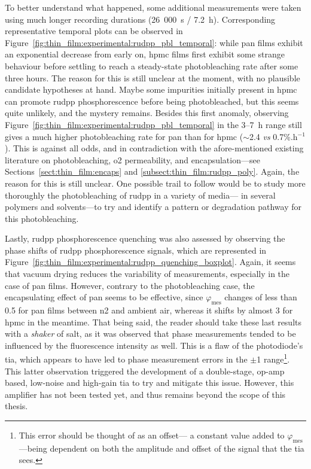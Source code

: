To better understand what happened, some additional measurements were taken using much longer recording durations (26~000~s / 7.2~h). Corresponding representative temporal plots can be observed in Figure~\ref{fig:thin_film:experimental:rudpp_pbl_temporal}: while \gls{pan} films exhibit an exponential decrease from early on, \gls{hpmc} films first exhibit some strange behaviour before settling to reach a steady-state photobleaching rate after some three hours. The reason for this is still unclear at the moment, with no plausible candidate hypotheses at hand. Maybe some impurities initially present in \gls{hpmc} can promote \gls{rudpp} phosphorescence before being photobleached, but this seems quite unlikely, and the mystery remains. Besides this first anomaly, observing Figure~\ref{fig:thin_film:experimental:rudpp_pbl_temporal} in the 3--7~h range still gives a much higher photobleaching rate for \gls{pan} than for \gls{hpmc} ($\sim$2.4 \textit{vs} 0.7\%.h$^{-1}$). This is against all odds, and in contradiction with the afore-mentioned existing literature on photobleaching, \gls{o2} permeability, and encapsulation---see Sections~\ref{sect:thin_film:encaps} and \ref{subsect:thin_film:rudpp_poly}. Again, the reason for this is still unclear. One \mfrin{}possible trail to follow would be to study more thoroughly the photobleaching of \gls{rudpp} in a variety of media---\ie{} in several polymers and solvents---to try and identify a pattern or degradation pathway for this photobleaching.

Lastly, \gls{rudpp} phosphorescence quenching was also assessed by observing the phase shifts of \gls{rudpp} phosphorescence signals, which are represented in Figure~\ref{fig:thin_film:experimental:rudpp_quenching_boxplot}. Again, it seems that vacuum drying reduces the variability of measurements, especially in the case of \gls{pan} films. However, contrary to the photobleaching case, the encapsulating effect of \gls{pan} seems to be effective, since $\varphi_\text{mes}$ changes of less than 0.5{\degree} for \gls{pan} films between \gls{n2} and ambient air, whereas it shifts by almost 3{\degree} for \gls{hpmc} in the meantime. That being said, the reader should take these last results with a \emph{shaker} of salt, as it was observed that phase measurements tended to be influenced by the fluorescence intensity as well. This is a flaw of the photodiode's \gls{tia}, which appears to have led to phase measurement errors in the $\pm$1{\degree} range\footnote{This error should be thought of as an offset---\ie{} a constant value added to $\varphi_\text{mes}$---being dependent on both the amplitude and offset of the signal that the \gls{tia} sees.}. This latter observation triggered the development of a double-stage, op-amp based, low-noise and high-gain \gls{tia} to try and mitigate this issue. However, this amplifier has not been tested yet, and thus remains beyond the scope of this thesis.

